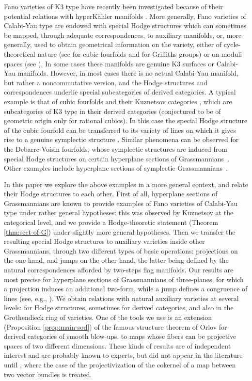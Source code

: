 \documentclass[JEP,XML,SOM,Unicode,NoEqCountersInSection]{cedram}
\theoremstyle{plain}
\theoremstyle{definition}
\begin{document}
Fano varieties of K3 type have recently been investigated because of their potential
relations with hyperKähler manifolds \cite{debarre-voisin,fm,imcy}. More generally, Fano varieties of Calabi-Yau type
are endowed with special Hodge structures which can sometimes be mapped, through adequate correspondences,
to auxiliary manifolds, or, more generally, used to obtain geometrical information on the variety,
either of cycle-theoretical nature (see \cite{hassett:special-cubics} for cubic fourfolds and \cite{fik-griffiths} for
Griffiths groups) or on moduli spaces (see \cite{debarre-voisin}).
In some cases these manifolds are genuine K3 surfaces or Calabi-Yau
manifolds. However, in most cases there is no actual Calabi-Yau manifold, but rather a
noncommutative version,
and the Hodge structures and correspondences underlie special subcategories of derived categories. A typical example
is that of cubic fourfolds and their Kuznetsov categories \cite{kuz:4fold,at12}, which are subcategories of
K3 type in their derived categories (conjectured to be of geometric origin only for
rational cubics). In this case the special Hodge structure of the cubic fourfold can be
transferred to its variety of lines on which it gives rise to a genuine symplectic structure \cite{beauville-donagi}.
Similar phenomena can be observed for the Debarre-Voisin fourfolds, whose symplectic
structures are induced from special Hodge structures on certain hyperplane sections
of Grassmannians~\cite{debarre-voisin}. Other examples include hyperplane sections
of symplectic Grassmannians~\cite{fm}.

In this paper we explore the above examples in a more general context, and
relate their Hodge structures to each other.
First of all, hyperplane sections of Grassmannians are known to provide examples of Fano varieties
of Calabi-Yau type under
rather general hypotheses: this was observed by Kuznetsov \cite{kuz-fractional} at the categorical level, and we
provide a Hodge-theoretic statement (Theorem \ref{thm:sect-of-G})
under slightly more general hypotheses.
Then we transfer the resulting special Hodge structures to auxiliary varieties inside
other Grassmannians, through two different types of basic operations: projections on the one
hand, and jumps on the other hand, the latter being defined by the natural correspondences
afforded by two-steps flag manifolds. Our results are most precise for hyperplane sections
of Grassmannians of three-planes, for which a projection induces an additional two-form, while
a jump defines a congruence of lines (see, e.g., \cite{dpfmr}). We obtain relations with natural auxiliary varieties
at several levels: for Hodge structures, sometimes for derived categories, and also in the
Grothendieck ring of varieties. One of the tools we use is an extension (Proposition \ref{prop:main-sod}) of the famous
structure theorem of Orlov for derived categories of smooth blow-ups, to maps whose
fibers can be projective spaces of two different dimensions. These kinds of results are of
independent interest and are probably known
to experts, but did not appear in the literature until \cite{Jiang-Leung}, where the case of
the projectivization of the cokernel of a map between two vector bundles is treated.
\end{document}
